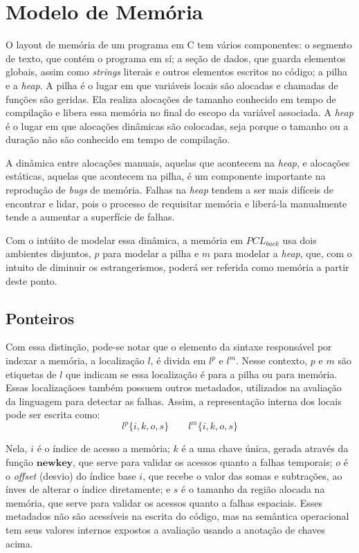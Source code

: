 \section{Modelo de Memória}

O layout de memória de um programa em C tem vários componentes: o segmento de texto, que contém o programa em sí; a seção de dados, que guarda elementos globais, assim como \emph{strings} literais e outros elementos escritos no código; a pilha e a \emph{heap}. A pilha é o lugar em que variáveis locais são alocadas e chamadas de funções são geridas. Ela realiza alocações de tamanho conhecido em tempo de compilação e libera essa memória no final do escopo da variável associada. A \emph{heap} é o lugar em que alocações dinâmicas são colocadas, seja porque o tamanho ou a duração não são conhecido em tempo de compilação.

A dinâmica entre alocações manuais, aquelas que acontecem na \emph{heap}, e alocações estáticas, aquelas que acontecem na pilha, é um componente importante na reprodução de \emph{bugs} de memória. Falhas na \emph{heap} tendem a ser mais difíceis de encontrar e lidar, pois o processo de requisitar memória e liberá-la manualmente tende a aumentar a superfície de falhas. 

Com o intúito de modelar essa dinâmica, a memória em $PCL_{back}$ usa dois ambientes disjuntos, $p$ para modelar a pilha e $m$ para modelar a \emph{heap}, que, com o intuito de diminuir os estrangerismos, poderá ser referida como memória a partir deste ponto. 

\subsection{Ponteiros}
\label{sec:pcl-back:ptr}

Com essa distinção, pode-se notar que o elemento da sintaxe responsável por indexar a memória, a localização $l$, é divida em $l^p$ e $l^m$. Nesse contexto, $p$ e $m$ são etiquetas de $l$ que indicam se essa localização é para a pilha ou para memória. Essas localizaçãoes também possuem outros metadados, utilizados na avaliação da linguagem para detectar as falhas. Assim, a representação interna dos locais pode ser escrita como:
\[ l^p\{i, k, o, s \} \quad\quad l^m\{i, k, o, s \} \]

Nela, $i$ é o índice de acesso a memória; $k$ é a uma chave única, gerada através da função $\mathbf{newkey}$, que serve para validar os acessos quanto a falhas temporais; $o$ é o \emph{offset} (desvio) do índice base $i$, que recebe o valor das somas e subtrações, ao ínves de alterar o índice diretamente; e $s$ é o tamanho da região alocada na memória, que serve para validar os acessos quanto a falhas espaciais. Esses metadados não são acessíveis na escrita do código, mas na semântica operacional tem seus valores internos expostos a avaliação usando a anotação de chaves acima.

